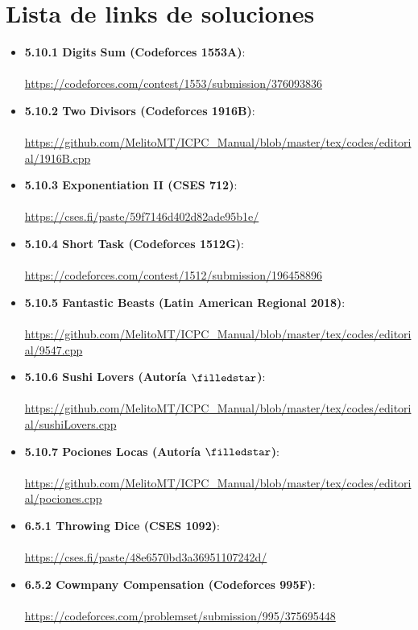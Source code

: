 \section*{Lista de links de soluciones}
\begin{itemize}
    \item \textbf{5.10.1 Digits Sum (Codeforces 1553A)}:
    \\\\ \url{https://codeforces.com/contest/1553/submission/376093836}
    \item \textbf{5.10.2 Two Divisors (Codeforces 1916B)}:
    \\\\ \url{https://github.com/MelitoMT/ICPC_Manual/blob/master/tex/codes/editorial/1916B.cpp}
    \item \textbf{5.10.3 Exponentiation II (CSES 712)}:
    \\\\ \url{https://cses.fi/paste/59f7146d402d82ade95b1e/}
    \item \textbf{5.10.4 Short Task (Codeforces 1512G)}:
    \\\\ \url{https://codeforces.com/contest/1512/submission/196458896}
    \item \textbf{5.10.5 Fantastic Beasts (Latin American Regional 2018)}:
    \\\\ \url{https://github.com/MelitoMT/ICPC_Manual/blob/master/tex/codes/editorial/9547.cpp}
    \item \textbf{5.10.6 Sushi Lovers (Autoría $\filledstar$)}:
    \\\\ \url{https://github.com/MelitoMT/ICPC_Manual/blob/master/tex/codes/editorial/sushiLovers.cpp}
    \item \textbf{5.10.7 Pociones Locas (Autoría $\filledstar$)}:
    \\\\ \url{https://github.com/MelitoMT/ICPC_Manual/blob/master/tex/codes/editorial/pociones.cpp}
    \item \textbf{6.5.1 Throwing Dice (CSES 1092)}:
    \\\\ \url{https://cses.fi/paste/48e6570bd3a36951107242d/}
    \item \textbf{6.5.2 Cowmpany Compensation (Codeforces 995F)}:
    \\\\ \url{https://codeforces.com/problemset/submission/995/375695448}

\end{itemize}
